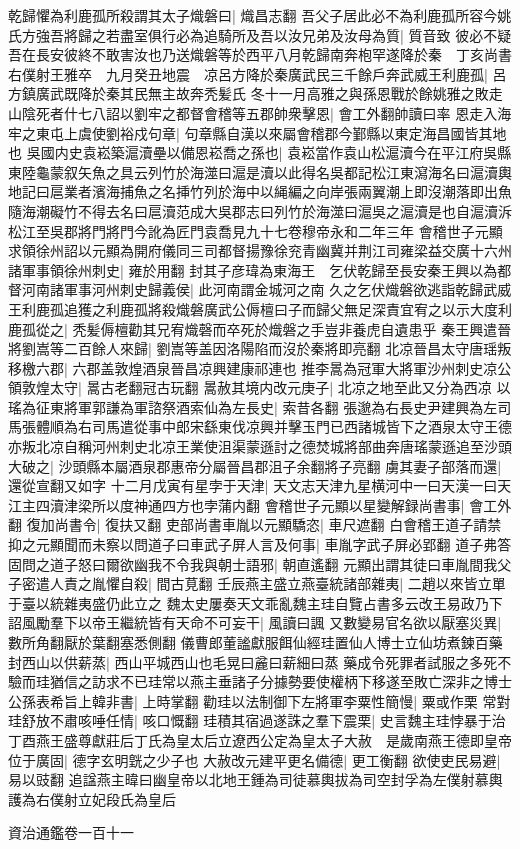 乾歸懼為利鹿孤所殺謂其太子熾磐曰|{
	熾昌志翻}
吾父子居此必不為利鹿孤所容今姚氏方強吾將歸之若盡室俱行必為追騎所及吾以汝兄弟及汝母為質|{
	質音致}
彼必不疑吾在長安彼終不敢害汝也乃送熾磐等於西平八月乾歸南奔枹罕遂降於秦　丁亥尚書右僕射王雅卒　九月癸丑地震　凉呂方降於秦廣武民三千餘戶奔武威王利鹿孤|{
	呂方鎮廣武既降於秦其民無主故奔秃髪氏}
冬十一月高雅之與孫恩戰於餘姚雅之敗走山陰死者什七八詔以劉牢之都督會稽等五郡帥衆擊恩|{
	會工外翻帥讀曰率}
恩走入海牢之東屯上虞使劉裕戍句章|{
	句章縣自漢以來屬會稽郡今鄞縣以東定海昌國皆其地也}
吳國内史袁崧築滬瀆壘以備恩崧喬之孫也|{
	袁崧當作袁山松滬瀆今在平江府吳縣東陸龜蒙叙矢魚之具云列竹於海澨曰滬是瀆以此得名吳都記松江東瀉海名曰滬瀆輿地記曰扈業者濱海捕魚之名挿竹列於海中以䋲編之向岸張兩翼潮上即沒潮落即出魚隨海潮礙竹不得去名曰扈瀆范成大吳郡志曰列竹於海澨曰滬吳之滬瀆是也自滬瀆泝松江至吳郡將門將門今訛為匠門袁喬見九十七卷穆帝永和二年三年}
會稽世子元顯求領徐州詔以元顯為開府儀同三司都督揚豫徐兖青幽冀并荆江司雍梁益交廣十六州諸軍事領徐州刺史|{
	雍於用翻}
封其子彦瑋為東海王　乞伏乾歸至長安秦王興以為都督河南諸軍事河州刺史歸義侯|{
	此河南謂金城河之南}
久之乞伏熾磐欲逃詣乾歸武威王利鹿孤追獲之利鹿孤將殺熾磐廣武公傉檀曰子而歸父無足深責宜宥之以示大度利鹿孤從之|{
	秃髪傉檀勸其兄宥熾磬而卒死於熾磐之手豈非養虎自遺患乎}
秦王興遣晉將劉嵩等二百餘人來歸|{
	劉嵩等盖因洛陽陷而沒於秦將即亮翻}
北凉晉昌太守唐瑶叛移檄六郡|{
	六郡盖敦煌酒泉晉昌凉興建康祁連也}
推李暠為冠軍大將軍沙州刺史凉公領敦煌太守|{
	暠古老翻冠古玩翻}
暠赦其境内改元庚子|{
	北凉之地至此又分為西凉}
以瑤為征東將軍郭謙為軍諮祭酒索仙為左長史|{
	索昔各翻}
張邈為右長史尹建興為左司馬張體順為右司馬遣從事中郎宋繇東伐凉興并擊玉門已西諸城皆下之酒泉太守王德亦叛北凉自稱河州刺史北凉王業使沮渠蒙遜討之德焚城將部曲奔唐瑤蒙遜追至沙頭大破之|{
	沙頭縣本屬酒泉郡惠帝分屬晉昌郡沮子余翻將子亮翻}
虜其妻子部落而還|{
	還從宣翻又如字}
十二月戊寅有星孛于天津|{
	天文志天津九星横河中一曰天漢一曰天江主四瀆津梁所以度神通四方也孛蒲内翻}
會稽世子元顯以星變解録尚書事|{
	會工外翻}
復加尚書令|{
	復扶又翻}
吏部尚書車胤以元顯驕恣|{
	車尺遮翻}
白會稽王道子請禁抑之元顯聞而未察以問道子曰車武子屏人言及何事|{
	車胤字武子屏必郢翻}
道子弗答固問之道子怒曰爾欲幽我不令我與朝士語邪|{
	朝直遙翻}
元顯出謂其徒曰車胤間我父子密遣人責之胤懼自殺|{
	間古莧翻}
壬辰燕主盛立燕臺統諸部雜夷|{
	二趙以來皆立單于臺以統雜夷盛仍此立之}
魏太史屢奏天文乖亂魏主珪自覽占書多云改王易政乃下詔風勵羣下以帝王繼統皆有天命不可妄干|{
	風讀曰諷}
又數變易官名欲以厭塞災異|{
	數所角翻厭於葉翻塞悉側翻}
儀曹郎董謐獻服餌仙經珪置仙人博士立仙坊煮鍊百藥封西山以供薪蒸|{
	西山平城西山也毛晃曰麄曰薪細曰蒸}
藥成令死罪者試服之多死不驗而珪猶信之訪求不已珪常以燕主垂諸子分據勢要使權柄下移遂至敗亡深非之博士公孫表希旨上韓非書|{
	上時掌翻}
勸珪以法制御下左將軍李粟性簡慢|{
	粟或作栗}
常對珪舒放不肅咳唾任情|{
	咳口慨翻}
珪積其宿過遂誅之羣下震栗|{
	史言魏主珪悖暴于治}
丁酉燕王盛尊獻莊后丁氏為皇太后立遼西公定為皇太子大赦　是歲南燕王德即皇帝位于廣固|{
	德字玄明皝之少子也}
大赦改元建平更名備德|{
	更工衡翻}
欲使吏民易避|{
	易以豉翻}
追諡燕主暐曰幽皇帝以北地王鍾為司徒慕輿拔為司空封孚為左僕射慕輿護為右僕射立妃段氏為皇后

資治通鑑卷一百十一
